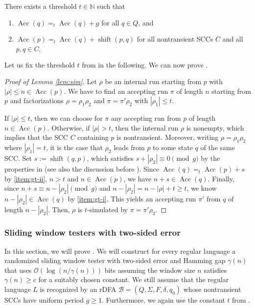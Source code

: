 \documentclass{theoretics}
\newcommand{\N}{\mathbb{N}}
\newcommand{\B}{\mathcal{B}}
\renewcommand{\O}{\mathcal{O}}
\DeclareMathOperator{\shift}{shift}
\DeclareMathOperator{\Acc}{Acc}
\renewcommand{\geq}{\geqslant}
\renewcommand{\leq}{\leqslant}
\renewcommand{\ge}{\geq}
\renewcommand{\le}{\leq}
\begin{document}
\begin{corollary}
\label{cor:gt}
There exists a threshold $t \in \N$ such that
\begin{enumerate}[label=(\roman{*}), ref=(\roman{*})]
	\item $\Acc(q) =_t \Acc(q) + g$ for all $q \in Q$, and \label{item:gt-i}
	\item $\Acc(p) =_t \Acc(q) + \shift(p,q)$ for all nontransient SCCs $C$ and all $p,q \in C$.
	\label{item:gt-ii}
\end{enumerate}
\end{corollary}

Let us fix the threshold $t$ from  in the following.
We can now prove .

\begin{proof}[Proof of Lemma \ref{lem:sim}]
Let $\rho$ be an internal run starting from $p$ with $|\rho| \leq n \in \Acc(p)$.
We have to find an accepting run $\pi$ of length $n$ starting from $p$ and factorizations 
$\rho = \rho_1 \rho_2$ and $\pi = \pi' \rho_2$ with $|\rho_1| \le t$.

If $|\rho| \le t$, then we can choose for $\pi$ any accepting run from $p$ of length $n \in \Acc(p)$.
Otherwise, if $|\rho| > t$, then the internal run $\rho$ is nonempty, which implies that the 
SCC $C$ containing $p$ is nontransient.
Moreover, writing $\rho = \rho_1 \rho_2$ where $|\rho_1| = t$, it is the case
that $\rho_2$ leads from $p$ to some state $q$ of the same SCC.
Set $s := \shift(q,p)$, which satisfies $s + |\rho_2| \equiv 0 \pmod g$
by the properties in  (see also the discussion before ).
Since $\Acc(q) =_t \Acc(p) + s$ by \ref{item:gt-ii}, $n > t$ and $n \in \Acc(p)$,
we have $n + s \in \Acc(q)$.
Finally, since $n + s \equiv n-|\rho_2| \pmod g$ and $n-|\rho_2| = n-|\rho|+t \ge t$,
we know $n-|\rho_2| \in \Acc(q)$ by \ref{item:gt-i}.
This yields an accepting run $\pi'$ from $q$ of length $n-|\rho_2|$.
Then, $\rho$ is $t$-simulated by $\pi = \pi' \rho_2$.
\end{proof}

\subsubsection{Sliding window testers with two-sided error}
\label{sec:two-sided}

In this section, we will prove .
We will construct for every regular language a randomized sliding window tester
with two-sided error and Hamming gap $\gamma(n)$ that uses $\O(\log(n/\gamma(n)))$ bits
assuming the window size $n$ satisfies $\gamma(n) \geq c$ for a suitably chosen constant.
We still assume that the regular language $L$
is recognized by an rDFA $\B = (Q,\Sigma,F,\delta,q_0)$
whose nontransient SCCs have uniform period $g \ge 1$.
Furthermore, we again use the constant $t$ from .
\end{document}
